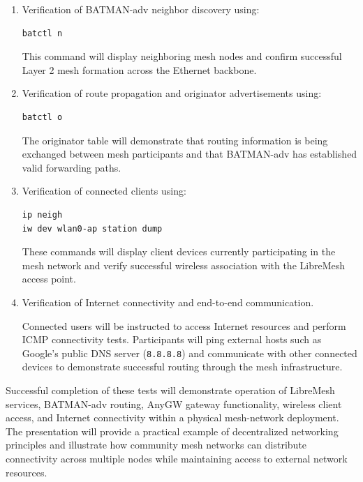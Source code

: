 \documentclass[conference]{IEEEtran}
\begin{document}
\begin{enumerate}

\item Verification of BATMAN-adv neighbor discovery using:

\begin{verbatim}
batctl n
\end{verbatim}

This command will display neighboring mesh nodes and confirm successful Layer 2 mesh formation across the Ethernet backbone.

\item Verification of route propagation and originator advertisements using:

\begin{verbatim}
batctl o
\end{verbatim}

The originator table will demonstrate that routing information is being exchanged between mesh participants and that BATMAN-adv has established valid forwarding paths.

\item Verification of connected clients using:

\begin{verbatim}
ip neigh
iw dev wlan0-ap station dump
\end{verbatim}

These commands will display client devices currently participating in the mesh network and verify successful wireless association with the LibreMesh access point.

\item Verification of Internet connectivity and end-to-end communication.

Connected users will be instructed to access Internet resources and perform ICMP connectivity tests. Participants will ping external hosts such as Google's public DNS server (\texttt{8.8.8.8}) and communicate with other connected devices to demonstrate successful routing through the mesh infrastructure.

\end{enumerate}

Successful completion of these tests will demonstrate operation of LibreMesh services, BATMAN-adv routing, AnyGW gateway functionality, wireless client access, and Internet connectivity within a physical mesh-network deployment. The presentation will provide a practical example of decentralized networking principles and illustrate how community mesh networks can distribute connectivity across multiple nodes while maintaining access to external network resources.
\end{document}

